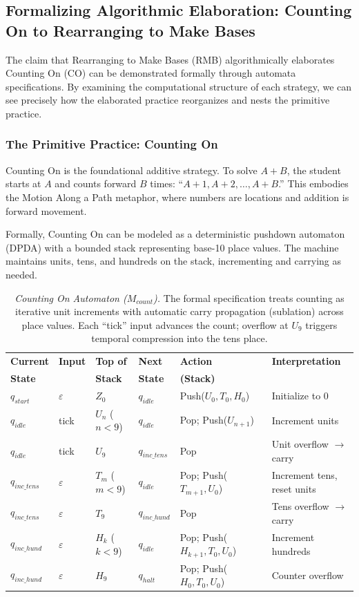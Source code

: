 \documentclass[12pt]{book}
\begin{document}
\subsection*{Formalizing Algorithmic Elaboration: Counting On to Rearranging to Make Bases}

The claim that Rearranging to Make Bases (RMB) algorithmically elaborates Counting On (CO) can be demonstrated formally through automata specifications. By examining the computational structure of each strategy, we can see precisely how the elaborated practice reorganizes and nests the primitive practice.

\subsubsection*{The Primitive Practice: Counting On}

Counting On is the foundational additive strategy. To solve $A + B$, the student starts at $A$ and counts forward $B$ times: ``$A+1, A+2, \ldots, A+B$.'' This embodies the Motion Along a Path metaphor, where numbers are locations and addition is forward movement.

Formally, Counting On can be modeled as a deterministic pushdown automaton (DPDA) with a bounded stack representing base-10 place values. The machine maintains units, tens, and hundreds on the stack, incrementing and carrying as needed.

\begin{table}[H]
\centering
\caption{\textit{Counting On Automaton ($M_{count}$).} The formal specification treats counting as iterative unit increments with automatic carry propagation (sublation) across place values. Each ``tick'' input advances the count; overflow at $U_9$ triggers temporal compression into the tens place.}
\label{tab:counting-on-automaton}
\begin{tabular}{@{}llllll@{}}
\toprule
\textbf{Current} & \textbf{Input} & \textbf{Top of} & \textbf{Next} & \textbf{Action} & \textbf{Interpretation} \\
\textbf{State} & & \textbf{Stack} & \textbf{State} & \textbf{(Stack)} & \\
\midrule
$q_{start}$ & $\varepsilon$ & $Z_0$ & $q_{idle}$ & Push($U_0, T_0, H_0$) & Initialize to 0 \\
$q_{idle}$ & tick & $U_n$ ($n<9$) & $q_{idle}$ & Pop; Push($U_{n+1}$) & Increment units \\
$q_{idle}$ & tick & $U_9$ & $q_{inc\_tens}$ & Pop & Unit overflow $\rightarrow$ carry \\
$q_{inc\_tens}$ & $\varepsilon$ & $T_m$ ($m<9$) & $q_{idle}$ & Pop; Push($T_{m+1}, U_0$) & Increment tens, reset units \\
$q_{inc\_tens}$ & $\varepsilon$ & $T_9$ & $q_{inc\_hund}$ & Pop & Tens overflow $\rightarrow$ carry \\
$q_{inc\_hund}$ & $\varepsilon$ & $H_k$ ($k<9$) & $q_{idle}$ & Pop; Push($H_{k+1}, T_0, U_0$) & Increment hundreds \\
$q_{inc\_hund}$ & $\varepsilon$ & $H_9$ & $q_{halt}$ & Pop; Push($H_0, T_0, U_0$) & Counter overflow \\
\bottomrule
\end{tabular}
\end{table}
\end{document}
